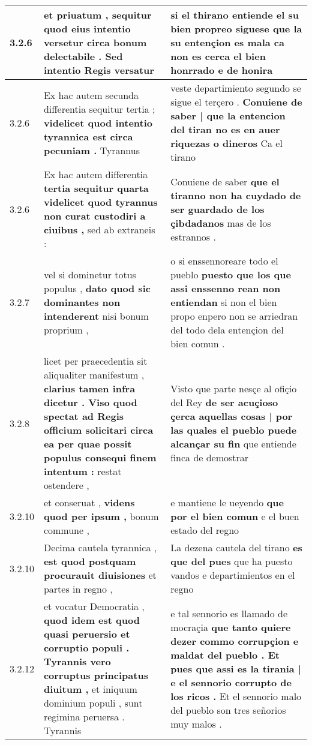 \begin{tabular}{|p{1cm}|p{6.5cm}|p{6.5cm}|}
3.2.6 & et priuatum , \textbf{ sequitur quod eius intentio versetur circa bonum delectabile . } Sed intentio Regis versatur & si el thirano entiende el su bien propreo \textbf{ siguese que la su entençion es mala } ca non es cerca el bien honrrado e de honira \\\hline
3.2.6 & Ex hac autem secunda differentia sequitur tertia ; \textbf{ videlicet quod intentio tyrannica est circa pecuniam . } Tyrannus & veste departimiento segundo se sigue el terçero . \textbf{ Conuiene de saber | que la entencion del tiran no es en auer riquezas o dineros } Ca el tirano \\\hline
3.2.6 & Ex hac autem differentia \textbf{ tertia sequitur quarta videlicet quod tyrannus non curat custodiri a ciuibus , } sed ab extraneis : & Conuiene de saber \textbf{ que el tiranno non ha cuydado de ser guardado de los çibdadanos } mas de los estrannos . \\\hline
3.2.7 & vel si dominetur totus populus , \textbf{ dato quod sic dominantes non intenderent } nisi bonum proprium , & o si enssennoreare todo el pueblo \textbf{ puesto que los que assi enssenno rean non entiendan } si non el bien propo enpero non se arriedran del todo dela entençion del bien comun . \\\hline
3.2.8 & licet per praecedentia sit aliqualiter manifestum , \textbf{ clarius tamen infra dicetur . Viso quod spectat ad Regis officium solicitari circa ea per quae possit populus consequi finem intentum : } restat ostendere , & Visto que parte nesçe al ofiçio del Rey \textbf{ de ser acuçioso çerca aquellas cosas | por las quales el pueblo puede alcançar su fin } que entiende finca de demostrar \\\hline
3.2.10 & et conseruat , \textbf{ videns quod per ipsum , } bonum commune , & e mantiene le ueyendo \textbf{ que por el bien comun } e el buen estado del regno \\\hline
3.2.10 & Decima cautela tyrannica , \textbf{ est quod postquam procurauit diuisiones } et partes in regno , & La dezena cautela del tirano \textbf{ es que del pues } que ha puesto vandos e departimientos en el regno \\\hline
3.2.12 & et vocatur Democratia , \textbf{ quod idem est quod quasi peruersio et corruptio populi . Tyrannis vero corruptus principatus diuitum , } et iniquum dominium populi , sunt regimina peruersa . Tyrannis & e tal sennorio es llamado de mocraçia \textbf{ que tanto quiere dezer commo corrupçion e maldat del pueblo . Et pues que assi es la tirania | e el sennorio corrupto de los ricos . } Et el sennorio malo del pueblo son tres señorios muy malos . \\\hline

\end{tabular}
